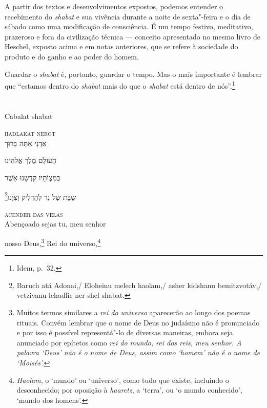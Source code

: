 A partir dos textos e desenvolvimentos expostos, podemos entender
o recebimento do \emph{shabat} e sua vivência durante a noite de sexta"-feira e o dia de sábado como uma modificação de consciência. É um tempo festivo, meditativo, prazeroso e fora da civilização técnica --- conceito apresentado no mesmo livro de Heschel, exposto acima e em notas anteriores, que se refere à sociedade do produto e do ganho e ao poder do homem.

Guardar o \emph{shabat} é, portanto, guardar o tempo. Mas o mais importante é lembrar que ``estamos dentro do \emph{shabat} mais do que o \emph{shabat} está dentro de nós''.\footnote{Idem, p.~32.}


\chapter*{}
\begin{center}
\begin{vplace}[0.3]
\Large
Cabalat shabat
\end{vplace}
\end{center}
\thispagestyle{empty}


\movetoevenpage
\raggedleft



\textsc{hadlakat nerot}\\[15pt]

אַדָנָי אַתָּה בָּרוּך

הָעוֹלָם מֶלֶך אֱלהֵינוּ

בְּמִצְוֹתָיו קִדְשָנוּ אַשֶׁר

\footnote{Baruch atá Adonai,/ Eloheinu melech haolam,/ asher kidshanu bemitzvotáv,/ vetzivanu lehadlic ner shel shabat.}שַבָּת שֶל נֵר לְהַדְלִיק וְצִוָנוּ‏

\movetooddpage
\raggedright

\textsc{acender das velas}\\[15pt]

Abençoado sejas tu, meu senhor

nosso Deus,\footnote{
Muitos termos similares a \textit{rei do universo} aparecerão ao
longo dos poemas rituais. Convém lembrar que o nome de Deus
no judaísmo não é pronunciado e por isso é possível representá"-lo de diversas
maneiras, embora seja anunciado por epítetos como \textit{rei do mundo, rei dos 
reis, meu senhor. A palavra `Deus' não é o nome de Deus, assim como `homem' não é o nome de `Moisés'.}}
Rei do universo,\footnote{\textit{Haolam}, o `mundo' ou `universo', como tudo que existe, incluindo o desconhecido; por oposição à \textit{haaretz}, a `terra', ou `o mundo conhecido', `mundo dos homens'.}

